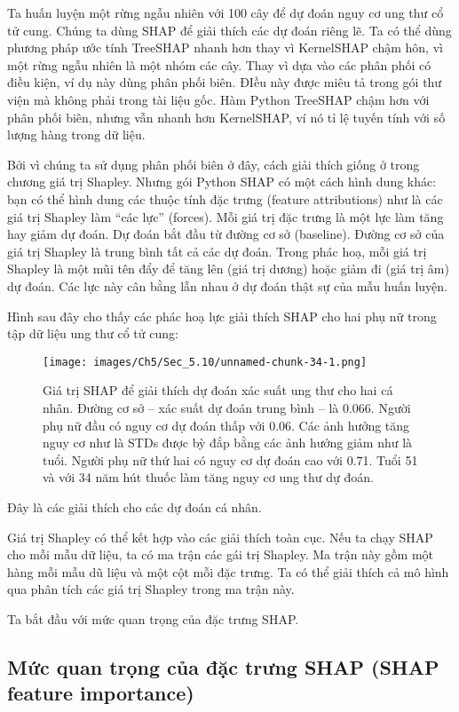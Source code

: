 \begin{enumerate}
Ta huấn luyện một rừng ngẫu nhiên với 100 cây để dự đoán nguy cơ ung thư cổ tử cung. Chúng ta dùng SHAP để giải thích các dự đoán riêng lẽ. Ta có thể dùng phương pháp ước tính TreeSHAP nhanh hơn thay vì KernelSHAP chậm hôn, vì một rừng ngẫu nhiên là một nhóm các cây. Thay vì dựa vào các phân phối có điều kiện, ví dụ này dùng phân phối biên. ĐIều này được miêu tả trong gói thư viện mà không phải trong tài liệu gốc. Hàm Python TreeSHAP chậm hơn với phân phối biên, nhưng vẫn nhanh hơn KernelSHAP, ví nó tỉ lệ tuyến tính với số lượng hàng trong dữ liệu. 

Bởi vì chúng ta sử dụng phân phối biên ở đây, cách giải thích giống ở trong chương giá trị Shapley. Nhưng gói Python SHAP có một cách hình dung khác: bạn có thể hình dung các thuộc tính đặc trưng (feature attributions) như là các giá trị Shapley làm “các lực” (forces). Mỗi giá trị đặc trưng là một lực làm tăng hay giảm dự đoán. Dự đoán bắt đầu từ đường cơ sở (baseline). Đường cơ sở của giá trị Shapley là trung bình tất cả các dự đoán. Trong phác hoạ, mỗi giá trị Shapley là một mũi tên đẩy để tăng lên (giá trị dương) hoặc giảm đi (giá trị âm) dự đoán. Các lực này cân bằng lẫn nhau ở dự đoán thật sự của mẫu huấn luyện. 

Hình sau đây cho thấy các phác hoạ lực giải thích SHAP cho hai phụ nữ trong tập dữ liệu ung thư cổ tử cung:

\begin{figure*}[h!]
	\centering
	\texttt{[image: images/Ch5/Sec\_5.10/unnamed-chunk-34-1.png]}
	\label{fig:5_50}
	\caption{Giá trị SHAP để giải thích dự đoán xác suất ung thư cho hai cá nhân. Đường cơ sở -- xác suất dự đoán trung bình – là 0.066. Người phụ nữ đầu có nguy cơ dự đoán thấp với 0.06. Các ảnh hưởng tăng nguy cơ như là STDs được bỳ đắp bằng các ảnh hưởng giảm như là tuổi. Người phụ nữ thứ hai có nguy cơ dự đoán cao với 0.71. Tuổi 51 và với 34 năm hút thuốc làm tăng  nguy cơ ung thư dự đoán.}
\end{figure*}

Đây là các giải thích cho các dự đoán cá nhân. 

Giá trị Shapley có thể kết hợp vào các giải thích toàn cục. Nếu ta chạy SHAP cho mỗi mẫu dữ liệu, ta có ma trận các gái trị Shapley. Ma trận này gồm một hàng mỗi mẫu dũ liệu và một cột mỗi đặc trưng. Ta có thể giải thích cả mô hình qua phân tích các giá trị Shapley trong ma trận này.

Ta bắt đầu với mức quan trọng của đặc trưng SHAP.

\subsection{Mức quan trọng của đặc trưng SHAP (SHAP feature importance)}


\end{enumerate}

